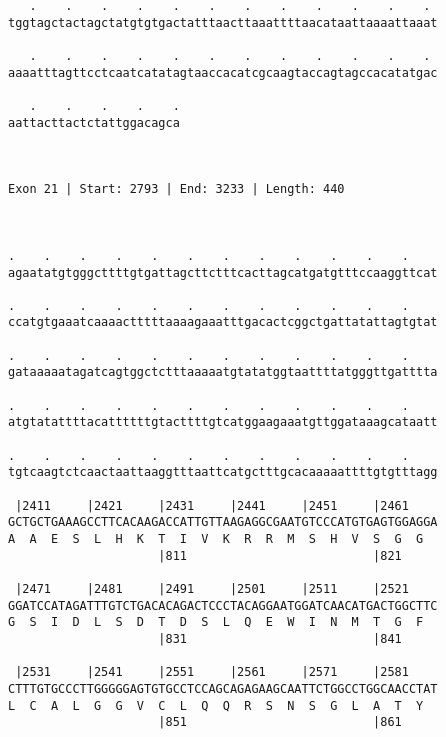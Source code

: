 \documentclass{article}
\begin{document}
\begin{Verbatim}
   .    .    .    .    .    .    .    .    .    .    .    . 
tggtagctactagctatgtgtgactatttaacttaaattttaacataattaaaattaaat
                                                            
   .    .    .    .    .    .    .    .    .    .    .    . 
aaaatttagttcctcaatcatatagtaaccacatcgcaagtaccagtagccacatatgac
                                                            
   .    .    .    .    .
aattacttactctattggacagca
                        
                        
 
Exon 21 | Start: 2793 | End: 3233 | Length: 440



.    .    .    .    .    .    .    .    .    .    .    .    
agaatatgtgggcttttgtgattagcttctttcacttagcatgatgtttccaaggttcat
                                                            
.    .    .    .    .    .    .    .    .    .    .    .    
ccatgtgaaatcaaaactttttaaaagaaatttgacactcggctgattatattagtgtat
                                                            
.    .    .    .    .    .    .    .    .    .    .    .    
gataaaaatagatcagtggctctttaaaaatgtatatggtaattttatgggttgatttta
                                                            
.    .    .    .    .    .    .    .    .    .    .    .    
atgtatattttacattttttgtacttttgtcatggaagaaatgttggataaagcataatt
                                                            
.    .    .    .    .    .    .    .    .    .    .    .    
tgtcaagtctcaactaattaaggtttaattcatgctttgcacaaaaattttgtgtttagg
                                                            
 |2411     |2421     |2431     |2441     |2451     |2461    
GCTGCTGAAAGCCTTCACAAGACCATTGTTAAGAGGCGAATGTCCCATGTGAGTGGAGGA
A  A  E  S  L  H  K  T  I  V  K  R  R  M  S  H  V  S  G  G  
                     |811                          |821     
  
 |2471     |2481     |2491     |2501     |2511     |2521    
GGATCCATAGATTTGTCTGACACAGACTCCCTACAGGAATGGATCAACATGACTGGCTTC
G  S  I  D  L  S  D  T  D  S  L  Q  E  W  I  N  M  T  G  F  
                     |831                          |841     
  
 |2531     |2541     |2551     |2561     |2571     |2581    
CTTTGTGCCCTTGGGGGAGTGTGCCTCCAGCAGAGAAGCAATTCTGGCCTGGCAACCTAT
L  C  A  L  G  G  V  C  L  Q  Q  R  S  N  S  G  L  A  T  Y  
                     |851                          |861     
  

\end{Verbatim}
\end{document}
